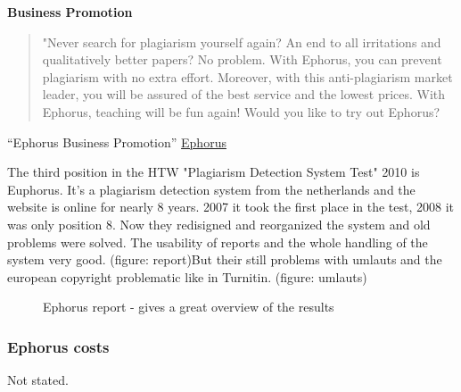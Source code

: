\textbf{Business Promotion}
\begin{quote}
"Never search for plagiarism yourself again? An end to all irritations and qualitatively better papers? No problem. With Ephorus, you can prevent plagiarism with no extra effort. Moreover, with this anti-plagiarism market leader, you will be assured of the best service and the lowest prices. With Ephorus, teaching will be fun again! Would you like to try out Ephorus?
\end{quote}
\enquote{Ephorus Business Promotion}\citep{Euphorus Website} \href{http://www.ephorus.com}{Ephorus}


The third position in the HTW "Plagiarism Detection System Test" 2010 is Euphorus. It's a plagiarism detection system from the netherlands and the website is online for nearly 8 years.
2007 it took the first place in the test, 2008 it was only position 8. Now they redisigned and reorganized the system and old problems were solved. The usability of reports and the whole handling of the system very good. (figure: report)But their still problems with umlauts and the european copyright problematic like in Turnitin. (figure: umlauts)


 \begin{figure}[!h]
  \centering
  \caption{Ephorus report - gives a great overview of the results}
  \label{fig:Ephorus_report}
\end{figure}




\subsubsection*{Ephorus costs}
Not stated.

